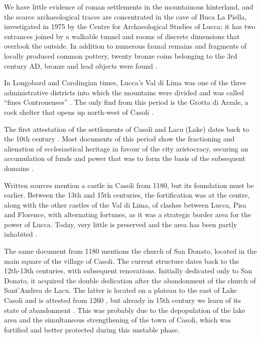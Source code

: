 \documentclass[sustainability,article,submit,pdftex,moreauthors]{Definitions/mdpi}
\begin{document}
We have little evidence of roman settlements in the mountainous hinterland, and the scarce archaeological traces are concentrated in the cave of Buca La Piella, investigated in 1975 by the Centre for Archaeological Studies of Lucca; it has two entrances joined by a walkable tunnel and rooms of discrete dimensions that overlook the outside. In addition to numerous faunal remains and fragments of locally produced common pottery, twenty bronze coins belonging to the 3rd century AD, bronze and lead objects were found \cite{gia96, men81, cia03}. 

In Longobard and Carolingian times, Lucca's Val di Lima was one of the three administrative districts into which the mountains were divided and was called “fines Contronenses” \cite{qui02, cia06, cia11}. The only find from this period is the Grotta di Arzale, a rock shelter that opens up north-west of Casoli \cite{gia96}.

The first attestation of the settlements of Casoli and Lacu (Lake) dates back to the 10th century \cite{bar41, gia96}. Most documents of this period show the fractioning and alienation of ecclesiastical heritage in favour of the city aristocracy, securing an accumulation of funds and power that was to form the basis of the subsequent domains \cite{qui02, gia96, for12, for15}.

Written sources mention a castle in Casoli from 1180, but its foundation must be earlier. Between the 13th and 15th centuries, the fortification was at the centre, along with the other castles of the Val di Lima, of clashes between Lucca, Pisa and Florence, with alternating fortunes, as it was a strategic border area for the power of Lucca. Today, very little is preserved and the area has been partly inhabited \cite{gia96, for12, rom16}.

The same document from 1180 mentions the church of San Donato, located in the main square of the village of Casoli. The current structure dates back to the 12th-13th centuries, with subsequent renovations. Initially dedicated only to San Donato, it acquired the double dedication after the abandonment of the church of Sant'Andrea de Lacu. The latter is located on a plateau to the east of Lake Casoli and is attested from 1260 \cite{ber18, gia96, cap17}, but already in 15th century we learn of its state of abandonment \cite{gia96, con12}. This was probably due to the depopulation of the lake area and the simultaneous strengthening of the town of Casoli, which was fortified and better protected during this unstable phase.
\end{document}
